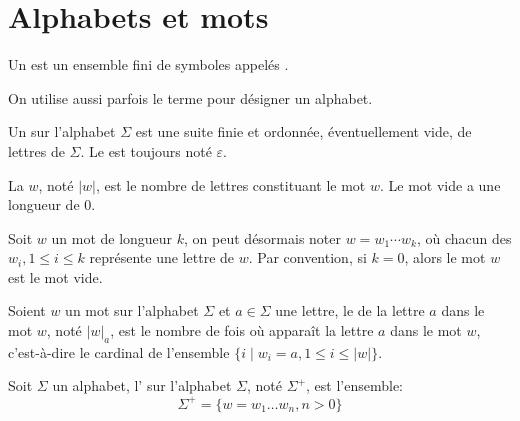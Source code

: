 \section{Alphabets et mots}

\begin{definition}
	Un  est un ensemble fini de symboles appelés .
\end{definition}

On utilise aussi parfois le terme  pour désigner un alphabet.

\begin{definition}
	Un  sur l'alphabet \( \Sigma \) est une suite finie et ordonnée, éventuellement vide, de lettres de \( \Sigma \). Le  est toujours noté \( \varepsilon\).
\end{definition}

\begin{definition}
	La  \( w \), noté \( |w| \), est le nombre de lettres constituant le mot \( w \). Le mot vide a une longueur de 0.
\end{definition}

Soit \( w \) un mot de longueur \( k \), on peut désormais noter \( w = w_1 \cdots w_k \), où chacun des \( w_i, 1 \leq i \leq k \) représente une lettre de \( w \). Par convention, si \( k = 0 \), alors le mot \( w \) est le mot vide.

\begin{definition}
	Soient \( w \) un mot sur l'alphabet \( \Sigma \) et \( a \in \Sigma \) une lettre, le  de la lettre \( a \) dans le mot \( w \), noté \( |w|_a \), est le nombre de fois où apparaît la lettre \( a \) dans le mot \( w \), c'est-à-dire le cardinal de l'ensemble \( \{ i \mid w_i = a, 1 \leq i \leq |w| \} \).
\end{definition}

\begin{definition}
	Soit \( \Sigma \) un alphabet, l' sur l'alphabet \( \Sigma \), noté \( \Sigma^+ \), est l'ensemble:
	\begin{equation}
		\Sigma^+ = \{ w = w_1 \ldots w_n, n > 0 \}
	\end{equation}
\end{definition}

